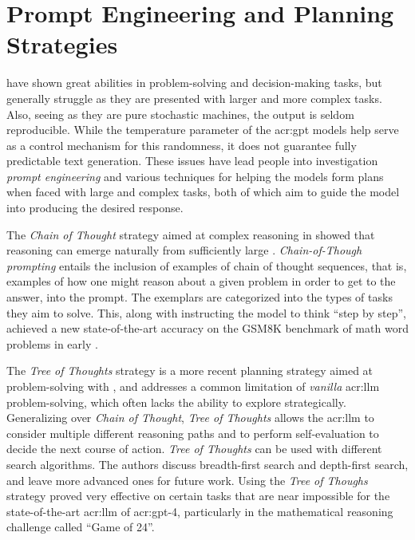 \section{Prompt Engineering and Planning Strategies}\label{sec:prompt-engineering-and-planning-strategies}

 have shown great abilities in problem-solving and decision-making tasks, but generally struggle as they are presented with larger and more complex tasks. Also, seeing as they are pure stochastic machines, the output is seldom reproducible. While the temperature parameter of the \acrshort{acr:gpt} models help serve as a control mechanism for this randomness, it does not guarantee fully predictable text generation. These issues have lead people into investigation \textit{prompt engineering} and various techniques for helping the models form plans when faced with large and complex tasks, both of which aim to guide the model into producing the desired response.

The \textit{Chain of Thought} strategy \citep{weiChainofThoughtPromptingElicits2023} aimed at complex reasoning in  showed that reasoning can emerge naturally from sufficiently large .  \textit{Chain-of-Though prompting} entails the inclusion of examples of chain of thought sequences, that is, examples of how one might reason about a given problem in order to get to the answer, into the prompt. The exemplars are categorized into the types of tasks they aim to solve. This, along with instructing the model to think \enquote{step by step}, achieved a new state-of-the-art accuracy on the GSM8K benchmark of math word problems in early \citeyear{weiChainofThoughtPromptingElicits2023}.

The \textit{Tree of Thoughts} strategy \citep{yaoTreeThoughtsDeliberate2023} is a more recent planning strategy aimed at problem-solving with , and addresses a common limitation of \textit{vanilla} \acrshort{acr:llm} problem-solving, which often lacks the ability to explore strategically. Generalizing over \textit{Chain of Thought}, \textit{Tree of Thoughts} allows the \acrshort{acr:llm} to consider multiple different reasoning paths and to perform self-evaluation to decide the next course of action. \textit{Tree of Thoughts} can be used with different search algorithms. The authors discuss breadth-first search and depth-first search, and leave more advanced ones for future work. Using the \textit{Tree  of Thoughs} strategy proved very effective on certain tasks that are near impossible for the state-of-the-art \acrshort{acr:llm} of \acrshort{acr:gpt}-4, particularly in the mathematical reasoning challenge called \enquote{Game of 24}.

